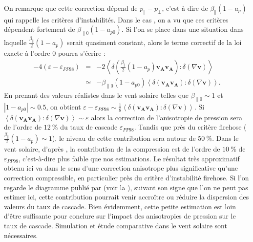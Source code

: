 On remarque que cette correction dépend de $p_{\parallel} - p_{\perp}$, c'est à dire de $\beta_{\parallel} (1-a_p)$ qui rappelle les critères d'instabilités. Dans le cas , on a vu que ces critères dépendent fortement de $\beta_{\parallel 0} (1-a_{p0})$. 
 Si l'on se place dans une situation dans laquelle $\frac{\beta_{\parallel}}{2}(1 - a_p)$ serait quasiment constant, alors le terme correctif de la loi exacte à l'ordre 0 pourra s'écrire : 
 \begin{eqnarray}
 \label{eq:turb_cpinc_gyrlin} 
 - 4(\varepsilon - \varepsilon_{PP98}) &=& -2 \left< \delta (\frac{\beta_{\parallel}}{2}(1 - a_p)\boldsymbol{v_A}\boldsymbol{v_A}):\delta (\nabla \boldsymbol{v}) \right>\\
 &\simeq& - \beta_{\parallel 0}(1 - a_{p0})\left< \delta (\boldsymbol{v_A}\boldsymbol{v_A}):\delta (\nabla \boldsymbol{v}) \right> .
 \end{eqnarray}
   En prenant des valeurs réalistes dans le vent solaire telles que  $\beta_{\parallel 0} \sim \num{1}$ et $|1-a_{p0}| \sim \num{0.5}$, on obtient $\varepsilon - \varepsilon_{PP98} \sim \frac{1}{8}\left< \delta (\boldsymbol{v_A}\boldsymbol{v_A}):\delta (\nabla \boldsymbol{v}) \right>  $. Si $\left< \delta (\boldsymbol{v_A}\boldsymbol{v_A}):\delta (\nabla \boldsymbol{v}) \right> \sim \varepsilon$ alors la correction de l'anisotropie de pression sera de l'ordre de $\SI{12}{\%}$ du taux de cascade $\varepsilon_{PP98}$. Tandis que près du critère firehose ($\frac{\beta_{\parallel}}{2}(1 - a_p)\sim 1$), le niveau de cette contribution sera autour de $\SI{50}{\%}$. Dans le vent solaire, d'après \cite{hadid_energy_2017}, la contribution de la compression est de l'ordre de $\SI{10}{\%}$ de $\varepsilon_{PP98}$, c'est-à-dire plus faible que nos estimations. Le résultat très approximatif obtenu ici va dans le sens d'une correction anisotrope plus significative qu'une correction compressible, en particulier près du critère d'instabilité firehose. Si l'on regarde le diagramme publié par \cite{osman_proton_2013} (voir la ), suivant son signe que l'on ne peut pas estimer ici, cette contribution pourrait venir accroître ou réduire la dispersion des valeurs du taux de cascade. Bien évidemment, cette petite estimation est loin d'être suffisante pour conclure sur l'impact des anisotropies de pression sur le taux de cascade. Simulation et étude comparative dans le vent solaire sont nécessaires.

